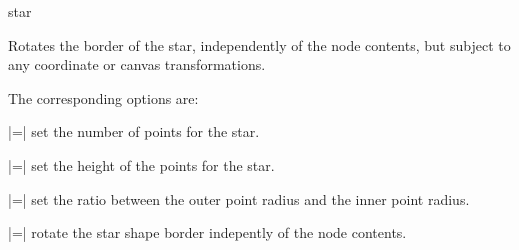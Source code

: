 \begin{shape}{star}
	\begin{command}{\pgfsetstarrotate{}}
		Rotates the border of the star, independently of the node contents,
		but subject to any coordinate or canvas transformations.	
	\end{command}
	
	The corresponding \tikzname{} options are:

	\begin{itemize}
   	|=|
    	set the number of points for the star.
    
   	|=|
   	set the height of the points for the star.
    
    	|=|
    	set the ratio between the outer point radius and the inner point
   	radius.
    
    	|=|
    	rotate the star shape border indepently of the node contents.
     
	\end{itemize}
\end{shape}